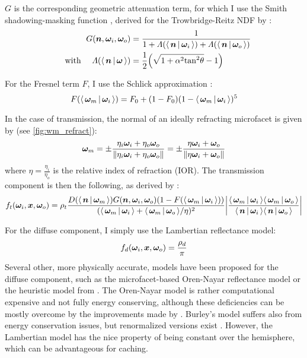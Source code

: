 $G$ is the corresponding geometric attenuation term, for which I use the Smith shadowing-masking function \parencite{smith1967}, derived for the Trowbridge-Reitz NDF by \textcite{walter2007}:
\begin{equation}
    \begin{aligned}
    G(\n, \wi, \wo) &= \frac{1}{1 + \Lambda(\NdotL) + \Lambda(\NdotV)}\\
    \quad \text{with } \quad
    \Lambda(\NdotX) &= \frac{1}{2} \left( \sqrt{1 + \alpha^2 \mathrm{tan}^2 \theta} - 1 \right)
    \end{aligned}
\end{equation}

For the Fresnel term $F$, I use the Schlick approximation \parencite{schlick1994}:
\begin{equation}
    F(\LdotH) = F_0 + (1 - F_0) (1 - \LdotH)^5
\end{equation}

In the case of transmission, the normal of an ideally refracting microfacet is given by (see \cref{fig:wm_refract}):
\begin{equation}
    \bm{\omega}_m = \pm\frac{\eta_i {\bm{\omega}_i} + \eta_o {\bm{\omega}_o}}{\|\eta_i {\bm{\omega}_i} + \eta_o {\bm{\omega}_o}\|} = \pm\frac{\eta {\bm{\omega}_i} + {\bm{\omega}_o}}{\|\eta {\bm{\omega}_i} + {\bm{\omega}_o}\|}
\end{equation}
where $\eta = \frac{\eta_i}{\eta_o}$ is the relative index of refraction (IOR).
The transmission component is then the following, as derived by \textcite{walter2007}:
\begin{equation}
    f_t(\wi, \vec{x}, \wo) = \rho_t \frac{D(\NdotH) G(\n, \wi, \wo) (1 - F(\LdotH))}{(\LdotH + \VdotH / \eta)^2} \left|\frac{\LdotH \VdotH}{\NdotL \NdotV}\right|
\end{equation}

For the diffuse component, I simply use the Lambertian reflectance model:
\begin{equation}
    f_d({\bm{\omega}_i}, \bm{x}, {\bm{\omega}_o}) = \frac{\rho_d}{\pi}
\end{equation}
Several other, more physically accurate, models have been proposed for the diffuse component, such as the microfacet-based Oren-Nayar reflectance model \parencite{oren1994} or the heuristic model from \textcite{burley2012}.
The Oren-Nayar model is rather computational expensive and not fully energy conserving, although these deficiencies can be mostly overcome by the improvements made by \textcite{fujii}.
Burley's model suffers also from energy conservation issues, but renormalized versions exist \parencite{lagarde2014}.
However, the Lambertian model has the nice property of being constant over the hemisphere, which can be advantageous for caching.

